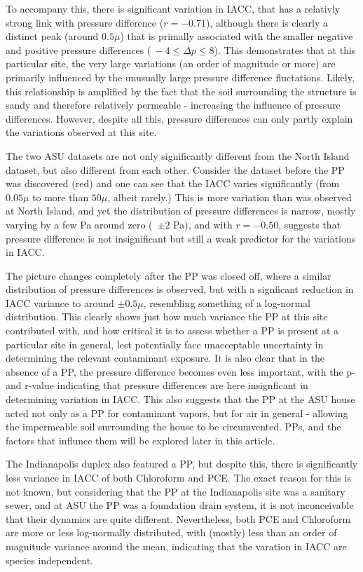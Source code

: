 \documentclass[journal=esthag,manuscript=article]{achemso}
\begin{document}
To accompany this, there is significant variation in IACC, that has a relativly strong link with pressure difference ($r = -0.71$), although there is clearly a distinct peak (around $0.5\mu$) that is primally associated with the smaller negative and positive pressure differences ($~-4 \leq \Delta p \leq 8$).
This demonstrates that at this particular site, the very large variations (an order of magnitude or more) are primarily influenced by the unusually large pressure difference fluctations.
Likely, this relationship is amplified by the fact that the soil surrounding the structure is sandy and therefore relatively permeable - increasing the influence of pressure differences.
However, despite all this, pressure differences can only partly explain the variations observed at this site.\par
The two ASU datasets are not only significantly different from the North Island dataset, but also different from each other.
Consider the dataset before the PP was discovered (red) and one can see that the IACC varies significantly (from $0.05 \mu$ to more than $50 \mu$, albeit rarely.)
This is more variation than was observed at North Island, and yet the distribution of pressure differences is narrow, mostly varying by a few Pa around zero (~$\pm 2$ Pa), and with $r = -0.50$, suggests that pressure difference is not insignificant but still a weak predictor for the variations in IACC.\par

The picture changes completely after the PP was closed off, where a similar distribution of pressure differences is observed, but with a signficant reduction in IACC variance to around $\pm 0.5 \mu$, resembling something of a log-normal distribution.
This clearly shows just how much variance the PP at this site contributed with, and how critical it is to assess whether a PP is present at a particular site in general, lest potentially face unacceptable uncertainty in determining the relevant contaminant exposure.
It is also clear that in the absence of a PP, the pressure difference becomes even less important, with the p- and r-value indicating that pressure differences are here insignficant in determining variation in IACC.
This also suggests that the PP at the ASU house acted not only as a PP for contaminant vapors, but for air in general - allowing the impermeable soil surrounding the house to be circumvented.
PPs, and the factors that influnce them will be explored later in this article.\par
The Indianapolis duplex also featured a PP, but despite this, there is significantly less variance in IACC of both Chloroform and PCE.
The exact reason for this is not known, but considering that the PP at the Indianapolis site was a sanitary sewer, and at ASU the PP was a foundation drain system, it is not inconceivable that their dynamics are quite different.
Nevertheless, both PCE and Chloroform are more or less log-normally distributed, with (mostly) less than an order of magnitude variance around the mean, indicating that the varation in IACC are species independent.\par
\end{document}
